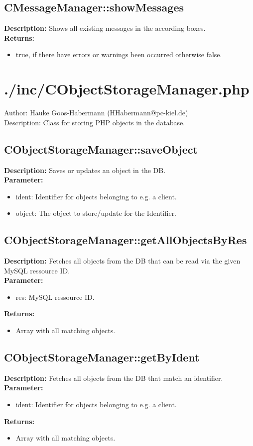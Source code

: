 \subsection{CMessageManager::showMessages}
\textbf{Description:} Shows all existing messages in the according boxes.\\
\textbf{Returns:}
\begin{itemize}
\item true, if there have errors or warnings been occurred otherwise false.
\end{itemize}

\newpage\section{./inc/CObjectStorageManager.php}
 Author: Hauke Goos-Habermann (HHabermann@pc-kiel.de)\\
 Description: Class for storing PHP objects in the database.\\

\subsection{CObjectStorageManager::saveObject}
\textbf{Description:} Saves or updates an object in the DB.\\
\textbf{Parameter:}
\begin{itemize}
\item ident: Identifier for objects belonging to e.g. a client.
\item object: The object to store/update for the Identifier.
\end{itemize}

\subsection{CObjectStorageManager::getAllObjectsByRes}
\textbf{Description:} Fetches all objects from the DB that can be read via the given MySQL ressource ID.\\
\textbf{Parameter:}
\begin{itemize}
\item res: MySQL ressource ID.
\end{itemize}
\textbf{Returns:}
\begin{itemize}
\item Array with all matching objects.
\end{itemize}

\subsection{CObjectStorageManager::getByIdent}
\textbf{Description:} Fetches all objects from the DB that match an identifier.\\
\textbf{Parameter:}
\begin{itemize}
\item ident: Identifier for objects belonging to e.g. a client.
\end{itemize}
\textbf{Returns:}
\begin{itemize}
\item Array with all matching objects.
\end{itemize}

